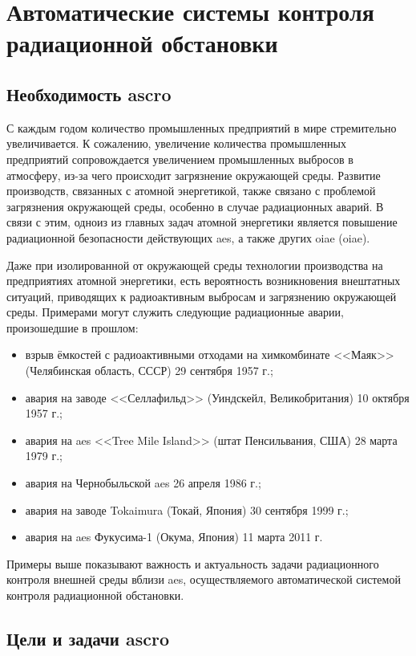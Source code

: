 \chapter{Автоматические системы контроля радиационной обстановки}

\section{Необходимость \ac{ascro}}

С каждым годом количество промышленных предприятий в мире стремительно увеличивается. К сожалению, увеличение количества 
промышленных предприятий сопровождается увеличением промышленных выбросов в атмосферу, из-за чего происходит загрязнение 
окружающей среды. Развитие производств, связанных с атомной энергетикой, также связано с проблемой загрязнения 
окружающей среды, особенно в случае радиационных аварий. В связи с этим, одноиз из главных задач атомной энергетики 
является повышение радиационной безопасности действующих \ac{aes}, а также других \ac{oiae} 
(\acl{oiae}).

Даже при изолированной от окружающей среды технологии производства на предприятиях атомной энергетики, есть вероятность 
возникновения внештатных ситуаций, приводящих к радиоактивным выбросам и загрязнению окружающей среды. Примерами могут 
служить следующие радиационные аварии, произошедшие в прошлом:

\begin{itemize}
	\item взрыв ёмкостей с радиоактивными отходами на химкомбинате <<Маяк>> (Челябинская область, СССР) 29 сентября 
		1957 г.;
	\item авария на заводе <<Селлафильд>> (Уиндскейл, Великобритания) 10 октября 1957 г.;
	\item авария на \ac{aes} <<Tree Mile Island>> (штат Пенсильвания, США) 28 марта 1979 г.;
	\item авария на Чернобыльской \ac{aes} 26 апреля 1986 г.;
	\item авария на заводе Tokaimura (Токай, Япония) 30 сентября 1999 г.;
	\item авария на \ac{aes} Фукусима-1 (Окума, Япония) 11 марта 2011 г.
\end{itemize}

Примеры выше показывают важность и актуальность задачи радиационного контроля внешней среды вблизи \ac{aes}, 
осуществляемого автоматической системой контроля радиационной обстановки. 

\section{Цели и задачи \ac{ascro} \cite{elokhin}}

